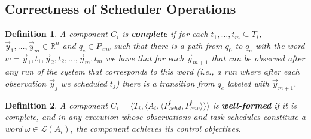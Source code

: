\documentclass[ twoside, 12pt ]{article}
\newcommand\R{{\mathbb R}}
\newtheorem{dfn}{Definition} %
\begin{document}
\subsection{Correctness of Scheduler Operations}

\begin{dfn}
    A component $C_i$ is \textbf{complete} if for each $t_1, \dots, t_m \subseteq T_i$, $\vec{y}_1, \dots , \vec{y}_m \in \R^n$ and $q_e \in P_{env}$ such that there is a path from $q_0$ to $q_e$ with the word $w= \vec{y}_1 , t_1 , \vec{y}_2 , t_2, \dots , \vec{y}_{m}, t_m$ we have that for each $\vec{y}_{m+1}$ that can be observed after any run of the system that corresponds to this word (i.e., a run where after each observation $\vec{y}_j$ we scheduled $t_j$) there is a transition from $q_e$ labeled with $\vec{y}_{m+1}$.
\end{dfn}

\begin{dfn}
    \label{thm:well-formed}
    A component $C_i= \langle T_i, \langle A_i, \langle P_{schd}^i, P_{env}^i\rangle\rangle\rangle$ is \textbf{well-formed} if it is complete, and in any execution whose observations and task schedules constitute a word $\omega \in \mathcal{L}(A_i)$, the component achieves its control objectives.
\end{dfn}
\end{document}

